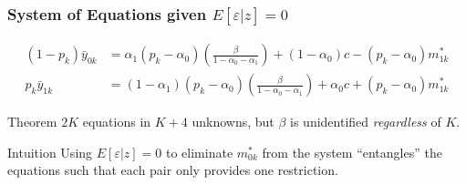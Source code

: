 \documentclass{beamer}
\begin{document}
%
\begin{frame}
  \frametitle{System of Equations given $E[\varepsilon|z]=0$}
  \small
  \alert{}
\begin{align*}
  (1 - p_k)\bar{y}_{0k} &=\alpha_1(p_k - \alpha_0)\left(\frac{\beta}{1 - \alpha_0 - \alpha_1}\right) + (1-\alpha_0)c - (p _k -  \alpha_0)m_{1k}^* \\[1.5ex]
  p_k\bar{y}_{1k} &=(1-\alpha_1)(p_k - \alpha_0)\left(\frac{\beta}{1 - \alpha_0 - \alpha_1}\right) + \alpha_0 c + (p _k -  \alpha_0)m_{1k}^*
\end{align*}

\begin{alertblock}{Theorem}
  $2K$ equations in $K+4$ unknowns, but $\beta$ is unidentified \emph{regardless} of $K$.
\end{alertblock}

\begin{block}{Intuition}
  Using $E[\varepsilon|z]=0$ to eliminate $m_{0k}^*$ from the system ``entangles'' the equations such that each pair only provides one restriction.
\end{block}

\end{frame}
%
\end{document}
